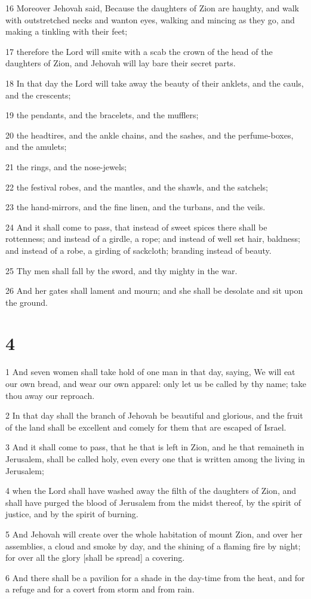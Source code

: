 \par 16 Moreover Jehovah said, Because the daughters of Zion are haughty, and walk with outstretched necks and wanton eyes, walking and mincing as they go, and making a tinkling with their feet;
\par 17 therefore the Lord will smite with a scab the crown of the head of the daughters of Zion, and Jehovah will lay bare their secret parts.
\par 18 In that day the Lord will take away the beauty of their anklets, and the cauls, and the crescents;
\par 19 the pendants, and the bracelets, and the mufflers;
\par 20 the headtires, and the ankle chains, and the sashes, and the perfume-boxes, and the amulets;
\par 21 the rings, and the nose-jewels;
\par 22 the festival robes, and the mantles, and the shawls, and the satchels;
\par 23 the hand-mirrors, and the fine linen, and the turbans, and the veils.
\par 24 And it shall come to pass, that instead of sweet spices there shall be rottenness; and instead of a girdle, a rope; and instead of well set hair, baldness; and instead of a robe, a girding of sackcloth; branding instead of beauty.
\par 25 Thy men shall fall by the sword, and thy mighty in the war.
\par 26 And her gates shall lament and mourn; and she shall be desolate and sit upon the ground.

\chapter{4}

\par 1 And seven women shall take hold of one man in that day, saying, We will eat our own bread, and wear our own apparel: only let us be called by thy name; take thou away our reproach.
\par 2 In that day shall the branch of Jehovah be beautiful and glorious, and the fruit of the land shall be excellent and comely for them that are escaped of Israel.
\par 3 And it shall come to pass, that he that is left in Zion, and he that remaineth in Jerusalem, shall be called holy, even every one that is written among the living in Jerusalem;
\par 4 when the Lord shall have washed away the filth of the daughters of Zion, and shall have purged the blood of Jerusalem from the midst thereof, by the spirit of justice, and by the spirit of burning.
\par 5 And Jehovah will create over the whole habitation of mount Zion, and over her assemblies, a cloud and smoke by day, and the shining of a flaming fire by night; for over all the glory [shall be spread] a covering.
\par 6 And there shall be a pavilion for a shade in the day-time from the heat, and for a refuge and for a covert from storm and from rain.

